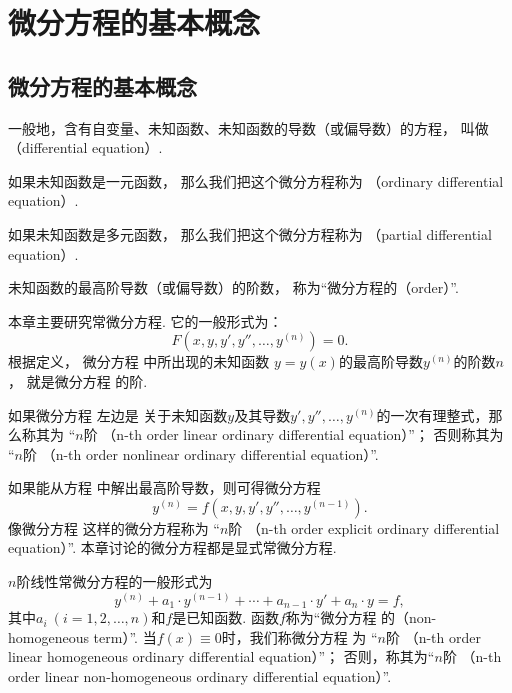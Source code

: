 \section{微分方程的基本概念}
\subsection{微分方程的基本概念}
一般地，含有自变量、未知函数、未知函数的导数（或偏导数）的方程，
叫做（differential equation）.

如果未知函数是一元函数，
那么我们把这个微分方程称为%
（ordinary differential equation）.

如果未知函数是多元函数，
那么我们把这个微分方程称为%
（partial differential equation）.

未知函数的最高阶导数（或偏导数）的阶数，
称为“微分方程的（order）”.

本章主要研究常微分方程.
它的一般形式为：
\begin{equation}\label{equation:微分方程.微分方程的一般形式}
	F\left( x,y,y',y'',\dotsc,y^{(n)} \right)=0.
\end{equation}
根据定义，
微分方程  中所出现的未知函数
\(y = y(x)\)的最高阶导数\(y^{(n)}\)的阶数\(n\)，
就是微分方程  的阶.

如果微分方程  左边是
关于未知函数\(y\)及其导数\(y',y'',\dotsc,y^{(n)}\)的一次有理整式，那么称其为
“\(n\)阶%
（n-th order linear ordinary differential equation）”；
否则称其为
“\(n\)阶%
（n-th order nonlinear ordinary differential equation）”.

如果能从方程  中解出最高阶导数，则可得微分方程
\begin{equation}\label{equation:微分方程.分离出最高阶导数}
	y^{(n)} = f\left( x,y,y',y'',\dotsc,y^{(n-1)} \right).
\end{equation}
像微分方程  这样的微分方程称为
“\(n\)阶%
（n-th order explicit ordinary differential equation）”.
本章讨论的微分方程都是显式常微分方程.

\(n\)阶线性常微分方程的一般形式为
\begin{equation}\label{equation:微分方程.线性常微分方程的一般形式}
	y^{(n)} + a_1 \cdot y^{(n-1)} + \dotsb + a_{n-1} \cdot y' + a_n \cdot y = f,
\end{equation}
其中\(a_i\ (i=1,2,\dotsc,n)\)和\(f\)是已知函数.
函数\(f\)称为“微分方程 
的（non-homogeneous term）”.
当\(f(x) \equiv 0\)时，我们称微分方程  为
“\(n\)阶%
（n-th order linear homogeneous ordinary differential equation）”；
否则，称其为“\(n\)阶%
（n-th order linear non-homogeneous ordinary differential equation）”.

